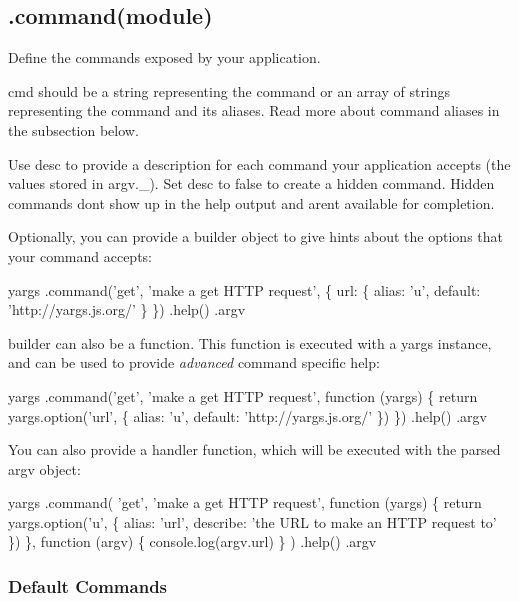 \subsection*{.command(module) }

Define the commands exposed by your application.

{\ttfamily cmd} should be a string representing the command or an array of strings representing the command and its aliases. Read more about command aliases in the subsection below.

Use {\ttfamily desc} to provide a description for each command your application accepts (the values stored in {\ttfamily argv.\+\_\+}). Set {\ttfamily desc} to {\ttfamily false} to create a hidden command. Hidden commands don\textquotesingle{}t show up in the help output and aren\textquotesingle{}t available for completion.

Optionally, you can provide a {\ttfamily builder} object to give hints about the options that your command accepts\+:


\begin{DoxyCode}
yargs
  .command('get', 'make a get HTTP request', \{
    url: \{
      alias: 'u',
      default: 'http://yargs.js.org/'
    \}
  \})
  .help()
  .argv
\end{DoxyCode}


{\ttfamily builder} can also be a function. This function is executed with a {\ttfamily yargs} instance, and can be used to provide {\itshape advanced} command specific help\+:


\begin{DoxyCode}
yargs
  .command('get', 'make a get HTTP request', function (yargs) \{
    return yargs.option('url', \{
      alias: 'u',
      default: 'http://yargs.js.org/'
    \})
  \})
  .help()
  .argv
\end{DoxyCode}


You can also provide a handler function, which will be executed with the parsed {\ttfamily argv} object\+:


\begin{DoxyCode}
yargs
  .command(
    'get',
    'make a get HTTP request',
    function (yargs) \{
      return yargs.option('u', \{
        alias: 'url',
        describe: 'the URL to make an HTTP request to'
      \})
    \},
    function (argv) \{
      console.log(argv.url)
    \}
  )
  .help()
  .argv
\end{DoxyCode}


\subsubsection*{Default Commands}

